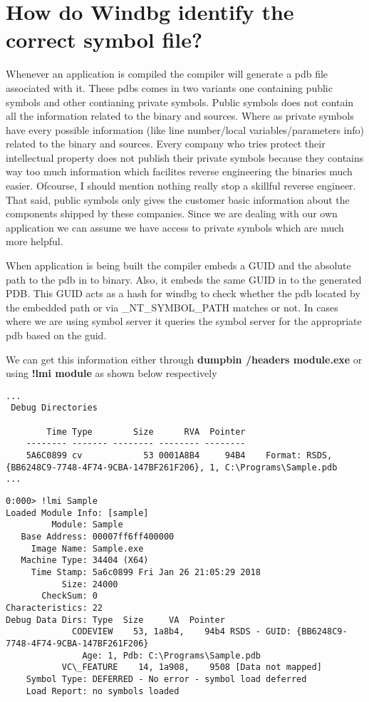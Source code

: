 \documentclass{article}
\begin{document}
\section{How do Windbg identify the correct symbol file?}
Whenever an application is compiled the compiler will generate a pdb file associated with it. These pdbs comes in two variants one containing public symbols and other contianing private symbols. Public symbols does not contain all the information related to the binary and sources. Where as private symbols have every possible information (like line number/local variables/parameters info) related to the binary and sources. Every company who tries protect their intellectual property does not publish their private symbols because they contains way too much information which facilites reverse engineering the binaries much easier. Ofcourse, I should mention nothing really stop a skillful reverse engineer. That said, public symbols only gives the customer basic information about the components shipped by these companies. Since we are dealing with our own application we can assume we have access to private symbols which are much more helpful.

When application is being built the compiler embeds a GUID and the absolute path to the pdb in to binary. Also, it embeds the same GUID in to the generated PDB. This GUID acts as a hash for windbg to check whether the pdb located by the embedded path or via \_NT\_SYMBOL\_PATH matches or not. In cases where we are using symbol server it queries the symbol server for the appropriate pdb based on the guid.

We can get this information either through \textbf{dumpbin /headers module.exe} or using \textbf{!lmi module} as shown below respectively
\begin{verbatim}
...
 Debug Directories

        Time Type        Size      RVA  Pointer
    -------- ------- -------- -------- --------
    5A6C0899 cv            53 0001A8B4     94B4    Format: RSDS, {BB6248C9-7748-4F74-9CBA-147BF261F206}, 1, C:\Programs\Sample.pdb
...
\end{verbatim}

\begin{verbatim}
0:000> !lmi Sample
Loaded Module Info: [sample]
         Module: Sample
   Base Address: 00007ff6ff400000
     Image Name: Sample.exe
   Machine Type: 34404 (X64)
     Time Stamp: 5a6c0899 Fri Jan 26 21:05:29 2018
           Size: 24000
       CheckSum: 0
Characteristics: 22
Debug Data Dirs: Type  Size     VA  Pointer
             CODEVIEW    53, 1a8b4,    94b4 RSDS - GUID: {BB6248C9-7748-4F74-9CBA-147BF261F206}
               Age: 1, Pdb: C:\Programs\Sample.pdb
           VC\_FEATURE    14, 1a908,    9508 [Data not mapped]
    Symbol Type: DEFERRED - No error - symbol load deferred
    Load Report: no symbols loaded
\end{verbatim}
\end{document}
